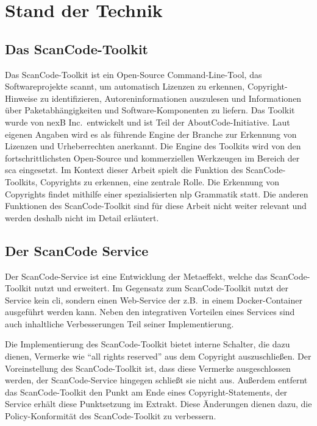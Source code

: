 \chapter{Stand der Technik}\label{ch:stand-der-technik}


\section{Das ScanCode-Toolkit}\label{sec:scancode-toolkit}

Das ScanCode-Toolkit ist ein Open-Source Command-Line-Tool, das Softwareprojekte scannt, um automatisch Lizenzen zu erkennen, Copyright-Hinweise zu identifizieren, Autoreninformationen auszulesen und Informationen über Paketabhängigkeiten und Software-Komponenten zu liefern.
Das Toolkit wurde von nexB Inc.\ entwickelt und ist Teil der AboutCode-Initiative.
Laut eigenen Angaben wird es als führende Engine der Branche zur Erkennung von Lizenzen und Urheberrechten anerkannt.
Die Engine des Toolkits wird von den fortschrittlichsten Open-Source und kommerziellen Werkzeugen im Bereich der \gls{sca} eingesetzt.
Im Kontext dieser Arbeit spielt die Funktion des ScanCode-Toolkits, Copyrights zu erkennen, eine zentrale Rolle.
Die Erkennung von Copyrights findet mithilfe einer spezialisierten \gls{nlp} Grammatik statt.
Die anderen Funktionen des ScanCode-Toolkit sind für diese Arbeit nicht weiter relevant und werden deshalb nicht im Detail erläutert\autocite{noauthor_scancode-toolkit-documentation_nodate}.


\section{Der ScanCode Service}\label{sec:scancode-service}

Der ScanCode-Service ist eine Entwicklung der Metaeffekt, welche das ScanCode-Toolkit nutzt und erweitert.
Im Gegensatz zum ScanCode-Toolkit nutzt der Service kein \gls{cli}, sondern einen Web-Service der z.B.\ in einem Docker-Container ausgeführt werden kann.
Neben den integrativen Vorteilen eines Services sind auch inhaltliche Verbesserungen Teil seiner Implementierung.

Die Implementierung des ScanCode-Toolkit bietet interne Schalter, die dazu dienen, Vermerke wie \enquote{all rights reserved} aus dem Copyright auszuschließen.
Der Voreinstellung des ScanCode-Toolkit ist, dass diese Vermerke ausgeschlossen werden, der ScanCode-Service hingegen schließt sie nicht aus.
Außerdem entfernt das ScanCode-Toolkit den Punkt am Ende eines Copyright-Statements, der Service erhält diese Punktsetzung im Extrakt.
Diese Änderungen dienen dazu, die Policy-Konformität des ScanCode-Toolkit zu verbessern\autocite{noauthor_metaeffekt-scancode-service_2025}.

